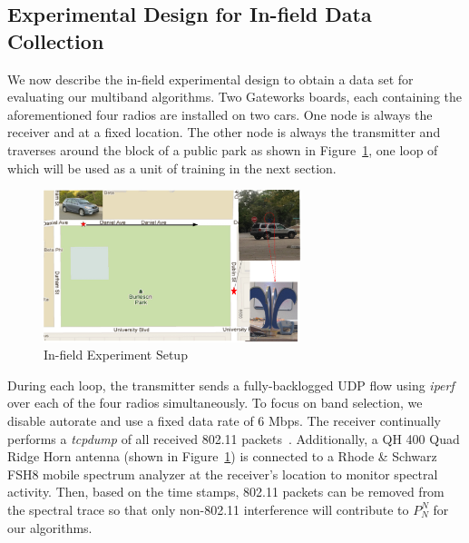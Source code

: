 \subsection{Experimental Design for In-field Data Collection}
\label{subsec:insitu}
We now describe the in-field experimental design to obtain a data set for
evaluating our multiband algorithms. Two Gateworks boards, each containing
the aforementioned four radios are installed on two cars.  One node is always
the receiver and at a fixed location. The other node is always the 
transmitter and traverses
around the block of a public park as shown in Figure~\ref{fig:infield},
one loop of which will be used as a unit of training in the next section.
 
\begin{figure}
\centering
\includegraphics[width=75mm]{figure/infield}
\vspace{-0.1in}
\caption{In-field Experiment Setup}
\label{fig:infield}
\vspace{-0.1in}
\end{figure}

During each loop, the transmitter sends a fully-backlogged UDP flow
using {\it iperf} over each of the four radios simultaneously.  To
focus on band selection, we disable autorate and use a fixed data rate
of 6 Mbps. The receiver continually performs a {\it tcpdump} of all
received 802.11 packets~\cite{jacobson1989tcpdump}. Additionally, a
QH 400 Quad Ridge Horn antenna (shown in Figure~\ref{fig:infield}) is 
connected to a Rhode \& Schwarz FSH8 mobile spectrum analyzer at the 
receiver's location to monitor spectral activity. Then, based on the 
time stamps, 802.11 packets can be removed from the spectral trace 
so that only non-802.11 interference will contribute to $P_N^N$ for 
our algorithms.

